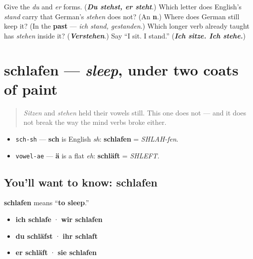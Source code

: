 \begin{tcolorbox}[breakable,colback=teal!4,colframe=teal!35!black,title={Before you move on}]
Give the \emph{du} and \emph{er} forms. (\emph{\textbf{Du stehst, er steht}}.) Which letter does English's \emph{stand} carry that German's \emph{stehen} does not? (An \textbf{n}.) Where does German still keep it? (In the \textbf{past} — \emph{ich stand, gestanden}.) Which longer verb already taught has \emph{stehen} inside it? (\emph{\textbf{Verstehen}}.) Say \textquotedblleft{}I sit. I stand.\textquotedblright{} (\emph{\textbf{Ich sitze. Ich stehe.}})
\end{tcolorbox}
\section[schlafen]{schlafen — \emph{sleep}, under two coats of paint}

\label{lesson:GE-C26-schlafen}



\begin{quote}
\emph{Sitzen} and \emph{stehen} held their vowels still. This one does not — and it does not break the way the mind verbs broke either.
\end{quote}

\begin{sounds}
\begin{itemize}
\raggedright
  \item \texttt{sch-sh} — \textbf{sch} is English \emph{sh}: \textbf{schlafen} = \emph{SHLAH-fen}.
  \item \texttt{vowel-ae} — \textbf{ä} is a flat \emph{eh}: \textbf{schläft} = \emph{SHLEFT}.
\end{itemize}
\end{sounds}

\subsection*{You'll want to know: schlafen}
\textbf{schlafen} means \textquotedblleft{}\textbf{to sleep}.\textquotedblright{}

\begin{itemize}
\raggedright
  \item \textbf{ich schlafe} · \textbf{wir schlafen}
  \item \textbf{du schläfst} · \textbf{ihr schlaft}
  \item \textbf{er schläft} · \textbf{sie schlafen}
\end{itemize}

